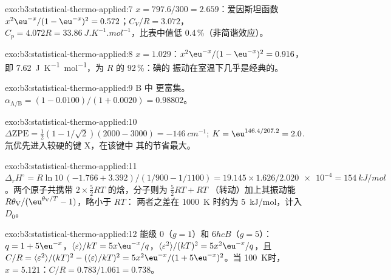 \begin{solution}{exo:b3:statistical-thermo-applied:7}
$x = 797.6/300 = 2.659$：爱因斯坦函数 $x^2\eu^{-x}/(1 - \eu^{-x})^2 = 0.572$；$C_V/R = 3.072$，
$C_p = 4.072R = \qty{33.86}{J.K^{-1}.mol^{-1}}$，比表中值低 0.4\,\%（非简谐效应）。
\end{solution}

\begin{solution}{exo:b3:statistical-thermo-applied:8}
$x = 1.029$：$x^2\eu^{-x}/(1 - \eu^{-x})^2 = 0.916$，即 \qty{7.62}{J.K^{-1}.mol^{-1}}，为 $R$ 的 92\,\%：碘的
振动在室温下几乎是经典的。
\end{solution}

\begin{solution}{exo:b3:statistical-thermo-applied:9}
B 中  更富集。$\alpha_{\mathrm{A/B}} = (1 - 0.0100)/(1 + 0.0020) = 0.98802$。
\end{solution}

\begin{solution}{exo:b3:statistical-thermo-applied:10}
$\Delta\mathrm{ZPE} = \frac12(1 - 1/\sqrt2)(2000 - 3000) = \qty{-146}{cm^{-1}}$; $K = \eu^{146.4/207.2} = 2.0$.
氘优先进入较硬的键 X，在该键中
其的节省最大。
\end{solution}

\begin{solution}{exo:b3:statistical-thermo-applied:11}
$\Delta_rH^\circ = R\ln10\,(-1.766 + 3.392)/(1/900 - 1/1100) = 19.145 \times 1.626/\num{2.020e-4} =
\qty{154}{kJ/mol}$。两个原子共携带 $2 \times \frac52RT$ 的焓，分子则为 $\frac52RT + RT$
（转动）加上其振动能 $R\theta_{\mathrm V}/(\eu^{\theta_{\mathrm V}/T} - 1)$，略小于 $RT$：
两者之差在 \qty{1000}{K} 时约为 \qty{5}{kJ/mol}，计入 $D_0$。
\end{solution}

\begin{solution}{exo:b3:statistical-thermo-applied:12}
能级 0（$g = 1$）和 $6hcB$（$g = 5$）：$q = 1 + 5\eu^{-x}$，$\langle\varepsilon\rangle/kT = 5x\eu^{-x}/q$，$\langle\varepsilon^2\rangle/(kT)^2 =
5x^2\eu^{-x}/q$，且 $C/R = \langle\varepsilon^2\rangle/(kT)^2 - (\langle\varepsilon\rangle/kT)^2 = 5x^2\eu^{-x}/(1 + 5\eu^{-x})^2$。当
\qty{100}{K}时，$x = 5.121$：$C/R = 0.783/1.061 = 0.738$。
\end{solution}

